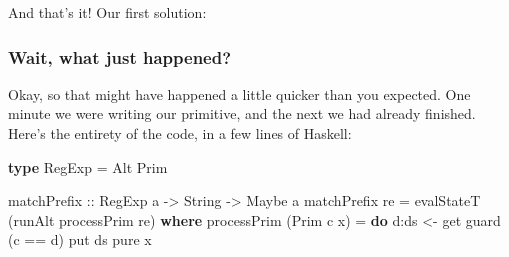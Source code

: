\documentclass[]{article}
\newenvironment{Shaded}{}{}
\newcommand{\DataTypeTok}[1]{\textcolor[rgb]{0.56,0.13,0.00}{#1}}
\newcommand{\DecValTok}[1]{\textcolor[rgb]{0.25,0.63,0.44}{#1}}
\newcommand{\FunctionTok}[1]{\textcolor[rgb]{0.02,0.16,0.49}{#1}}
\newcommand{\KeywordTok}[1]{\textcolor[rgb]{0.00,0.44,0.13}{\textbf{#1}}}
\newcommand{\NormalTok}[1]{#1}
\newcommand{\OtherTok}[1]{\textcolor[rgb]{0.00,0.44,0.13}{#1}}
\newcommand{\StringTok}[1]{\textcolor[rgb]{0.25,0.44,0.63}{#1}}
\begin{document}
And that's it! Our first solution:

\begin{Shaded}
\end{Shaded}

\hypertarget{wait-what-just-happened}{%
\subsubsection{Wait, what just happened?}\label{wait-what-just-happened}}

Okay, so that might have happened a little quicker than you expected. One minute
we were writing our primitive, and the next we had already finished. Here's the
entirety of the code, in a few lines of Haskell:

\begin{Shaded}
\begin{Highlighting}[]
\KeywordTok{type} \DataTypeTok{RegExp} \FunctionTok{=} \DataTypeTok{Alt} \DataTypeTok{Prim}

\OtherTok{matchPrefix ::} \DataTypeTok{RegExp}\NormalTok{ a }\OtherTok{->} \DataTypeTok{String} \OtherTok{->} \DataTypeTok{Maybe}\NormalTok{ a}
\NormalTok{matchPrefix re }\FunctionTok{=}\NormalTok{ evalStateT (runAlt processPrim re)}
  \KeywordTok{where}
\NormalTok{    processPrim (}\DataTypeTok{Prim}\NormalTok{ c x) }\FunctionTok{=} \KeywordTok{do}
\NormalTok{      d}\FunctionTok{:}\NormalTok{ds }\OtherTok{<-}\NormalTok{ get}
\NormalTok{      guard (c }\FunctionTok{==}\NormalTok{ d)}
\NormalTok{      put ds}
      \FunctionTok{pure}\NormalTok{ x}
\end{Highlighting}
\end{Shaded}
\end{document}
